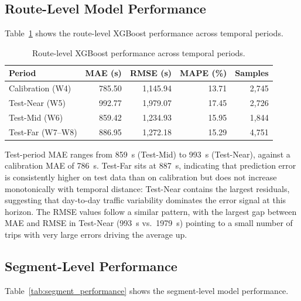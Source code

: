 \documentclass[12pt, a4paper, oneside]{report}
\begin{document}
\subsection{Route-Level Model Performance}

Table~\ref{tab:route_performance} shows the route-level XGBoost performance across temporal periods.

\begin{table}[H]
\centering
\caption{Route-level XGBoost performance across temporal periods.}
\label{tab:route_performance}
\begin{tabular}{lrrrr}
\toprule
\textbf{Period} & \textbf{MAE (s)} & \textbf{RMSE (s)} & \textbf{MAPE (\%)} & \textbf{Samples} \\
\midrule
Calibration (W4) & 785.50 & 1,145.94 & 13.71 & 2,745 \\
Test-Near (W5) & 992.77 & 1,979.07 & 17.45 & 2,726 \\
Test-Mid (W6) & 859.42 & 1,234.93 & 15.95 & 1,844 \\
Test-Far (W7--W8) & 886.95 & 1,272.18 & 15.29 & 4,751 \\
\bottomrule
\end{tabular}
\end{table}

Test-period MAE ranges from 859~s (Test-Mid) to 993~s (Test-Near), against a calibration MAE of 786~s. Test-Far sits at 887~s, indicating that prediction error is consistently higher on test data than on calibration but does not increase monotonically with temporal distance: Test-Near contains the largest residuals, suggesting that day-to-day traffic variability dominates the error signal at this horizon. The RMSE values follow a similar pattern, with the largest gap between MAE and RMSE in Test-Near (993~s vs.\ 1979~s) pointing to a small number of trips with very large errors driving the average up.



\subsection{Segment-Level Performance}

Table~\ref{tab:segment_performance} shows the segment-level model performance.
\end{document}
